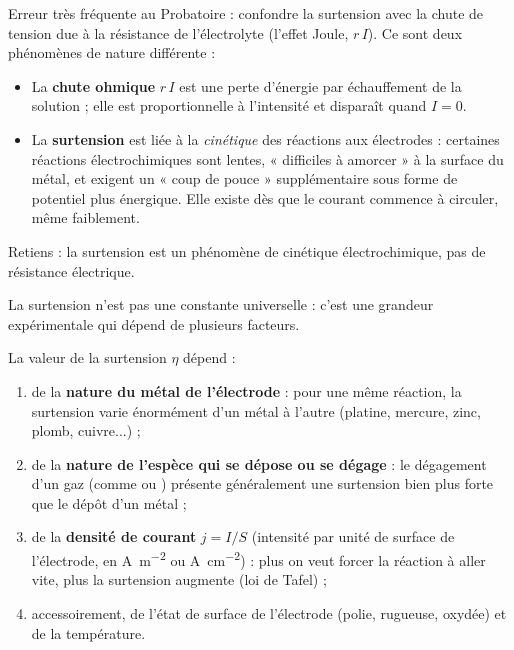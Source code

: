 \documentclass[11pt]{article}
\newcommand{\cle}[1]{{\popxbold\color{popdark}#1}}
\newcounter{popsec}
\newcounter{popsub}
\newcommand{\courssub}[1]{%
  \stepcounter{popsub}%
  \par\vspace{9pt}\noindent{\popxbold\fontsize{11.5}{13}\selectfont\color{popink}{\color{poporange}\thepopsec.\thepopsub}\hspace{6pt}#1}\par\nopagebreak\vspace{4pt}
}
\begin{document}
\begin{attention}
Erreur très fréquente au Probatoire : confondre la surtension avec la chute de tension due à la résistance de l'électrolyte (l'effet Joule, $r\,I$). Ce sont deux phénomènes de nature différente :
\begin{itemize}
\item La \textbf{chute ohmique} $r\,I$ est une perte d'énergie par échauffement de la solution ; elle est proportionnelle à l'intensité et disparaît quand $I = 0$.
\item La \textbf{surtension} est liée à la \emph{cinétique} des réactions aux électrodes : certaines réactions électrochimiques sont lentes, « difficiles à amorcer » à la surface du métal, et exigent un « coup de pouce » supplémentaire sous forme de potentiel plus énergique. Elle existe dès que le courant commence à circuler, même faiblement.
\end{itemize}
Retiens : la surtension est un phénomène de \cle{cinétique électrochimique}, pas de résistance électrique.
\end{attention}

\courssub{De quoi dépend la surtension ?}

La surtension n'est pas une constante universelle : c'est une grandeur expérimentale qui dépend de plusieurs facteurs.

\begin{propriete}
La valeur de la surtension $\eta$ dépend :
\begin{enumerate}
\item de la \textbf{nature du métal de l'électrode} : pour une même réaction, la surtension varie énormément d'un métal à l'autre (platine, mercure, zinc, plomb, cuivre...) ;
\item de la \textbf{nature de l'espèce qui se dépose ou se dégage} : le dégagement d'un gaz (comme  ou ) présente généralement une surtension bien plus forte que le dépôt d'un métal ;
\item de la \textbf{densité de courant} $j = I/S$ (intensité par unité de surface de l'électrode, en \si{A.m^{-2}} ou \si{A.cm^{-2}}) : plus on veut forcer la réaction à aller vite, plus la surtension augmente (loi de Tafel) ;
\item accessoirement, de l'état de surface de l'électrode (polie, rugueuse, oxydée) et de la température.
\end{enumerate}
\end{propriete}
\end{document}
